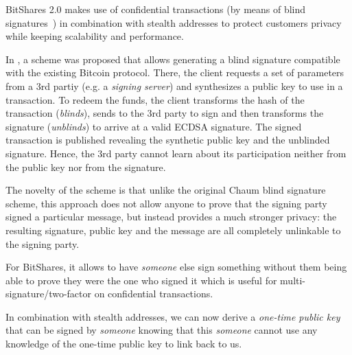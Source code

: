 
BitShares 2.0 makes use of confidential transactions (by means of blind
signatures~\cite{blindSigPaper}) in combination with stealth addresses to
protect customers privacy while keeping scalability and performance.

In \cite{blindSigPaper}, a scheme was proposed that allows generating a blind
signature compatible with the existing Bitcoin protocol. There, the client
requests a set of parameters from a 3rd partiy (e.g. a \emph{signing server})
and synthesizes a public key to use in a transaction. To redeem the funds, the
client transforms the hash of the transaction (\emph{blinds}), sends to the 3rd
party to sign and then transforms the signature (\emph{unblinds}) to arrive at
a valid ECDSA signature. The signed transaction is published revealing the
synthetic public key and the unblinded signature. Hence, the 3rd party cannot
learn about its participation neither from the public key nor from the
signature.

The novelty of the scheme is that unlike the original Chaum blind signature
scheme, this approach does not allow anyone to prove that the signing party
signed a particular message, but instead provides a much stronger privacy: the
resulting signature, public key and the message are all completely unlinkable
to the signing party.

For BitShares, it allows to have \emph{someone} else sign something without
them being able to prove they were the one who signed it which is useful for
multi-signature/two-factor on confidential transactions.

In combination with stealth addresses, we can now derive a \emph{one-time
public key} that can be signed by \emph{someone} knowing that this
\emph{someone} cannot use any knowledge of the one-time public key to link back
to us.
